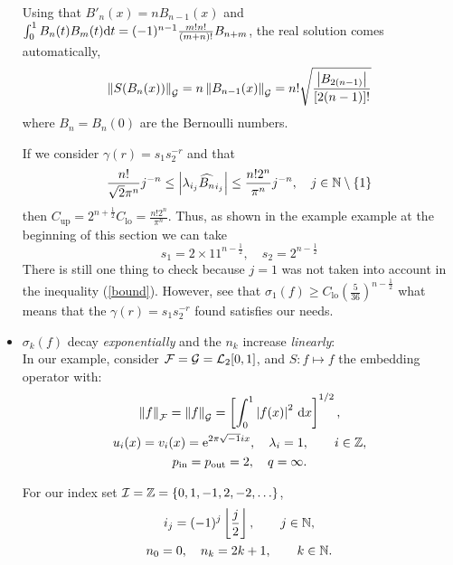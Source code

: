 \documentclass[final]{elsarticle}
\newcommand{\pin}{p_{\text{\rm{in}}}}
\newcommand{\pout}{p_{\text{\rm{out}}}}
\theoremstyle{definition}
\theoremstyle{remark}
\DeclareMathOperator{\up}{up}
\DeclareMathOperator{\lo}{lo}
\begin{document}
\begin{itemize}
Using that $B'_n(x)=nB_{n-1}(x)$ and $\int_0^1B_n(t)B_m(t)\dif t=(-1)^{n-1}\frac{m!n!}{(m+n)!}B_{n+m}$, the real solution comes automatically,
\begin{equation*}
\norm[\cg]{S(B_n(x))}=n\norm[\cg]{B_{n-1}(x)}=n!\sqrt{\frac{\abs{B_{2(n-1)}}}{[2(n-1)]!}}
\end{equation*}
where $B_n=B_n(0)$ are the Bernoulli numbers.

If we consider $\gamma(r)=s_1s_2^{-r}$ and that
\begin{equation}\label{bound}
\frac{n!}{\sqrt{2}\pi^n}j^{-n} \le \abs{\lambda_{i_j}\widehat{B_n}_{i_j}} \le \frac{n!2^n}{\pi^n}j^{-n},\quad j\in\naturals\setminus\{1\}
\end{equation}
then $C_{\up}=2^{n+\frac{1}{2}}C_{\lo}=\frac{n!2^n}{\pi^n}$. Thus, as shown in the example example at the beginning of this section we can take
\begin{equation*}
s_1=2\times11^{n-\frac{1}{2}},\quad s_2=2^{n-\frac{1}{2}}
\end{equation*}
There is still one thing to check because $j=1$ was not taken into account in the inequality (\ref{bound}). However, see that $\sigma_1(f) \ge C_{\lo}\left(\frac{5}{36}\right)^{n-\frac{1}{2}}$ what means that the $\gamma(r)=s_1s_2^{-r}$ found satisfies our needs.

\item $\sigma_k(f)$ decay \emph{exponentially} and the $n_k$ increase \emph{linearly}:\\
In our example, consider $\cf=\cg=\cl_2[0,1]$, and $S: f \mapsto f$ the embedding operator with:
\begin{gather*}
\norm[\cf]{f} = \norm[\cg]{f} = \left[\int_0^1 \abs{f(x)}^2 \, \dif x \right]^{1/2}, \\
u_{i}(x) = v_i(x) = \me^{2 \pi \sqrt{-1} i x},\quad \lambda_i=1, \qquad i \in \integers,\\
\pin=\pout=2,\quad q=\infty.
\end{gather*}

For our index set $\ci=\integers=\{0,1,-1,2,-2,\ldots\}$,
\begin{gather*}
i_j=(-1)^{j}\left\lfloor\frac{j}{2}\right\rfloor,\qquad j\in\naturals,\\
n_0=0,\quad n_k=2k+1, \qquad k\in\naturals.
\end{gather*}


\end{itemize}
\end{document}

